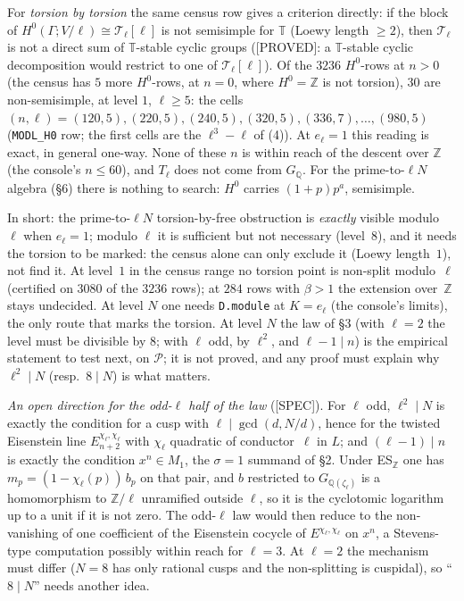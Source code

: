 \documentclass[11pt]{article}
\newcommand{\Z}{\mathbb{Z}}
\newcommand{\Q}{\mathbb{Q}}
\newcommand{\Ga}{\Gamma}
\newcommand{\code}[1]{\texttt{#1}}
\newcommand{\PROVED}{\textsf{\small[PROVED]}}
\newcommand{\PGSPEC}{\textsf{\small[SPEC]}}
\begin{document}
For \emph{torsion by torsion} the same census row gives a criterion directly: if the block of $H^{0}(\Ga;V/\ell)\cong\mathcal T_\ell[\ell]$ is not semisimple for $\mathbb T$ (Loewy length $\ge2$), then $\mathcal T_\ell$ is not a direct sum of $\mathbb T$-stable cyclic groups (\PROVED: a $\mathbb T$-stable cyclic decomposition would restrict to one of $\mathcal T_\ell[\ell]$). Of the $3236$ $H^{0}$-rows at $n>0$ (the census has $5$ more $H^{0}$-rows, at $n=0$, where $H^{0}=\Z$ is not torsion), $30$ are non-semisimple, at level $1$, $\ell\ge5$: the cells $(n,\ell)=(120,5),(220,5),(240,5),(320,5),(336,7),\dots,(980,5)$ (\code{MODL\_H0} row; the first cells are the $\ell^{3}-\ell$ of {}(4)). At $e_\ell=1$ this reading is exact, in general one-way. None of these $n$ is within reach of the descent over $\Z$ (the console's $n\le60$), and $T_\ell$ does not come from $G_\Q$. For the prime-to-$\ell N$ algebra (\S6) there is nothing to search: $H^{0}$ carries $(1+p)p^{a}$, semisimple.

In short: the prime-to-$\ell N$ torsion-by-free obstruction is \emph{exactly} visible modulo~$\ell$ when $e_\ell=1$; modulo $\ell$ it is sufficient but not necessary (level~$8$), and it needs the torsion to be marked: the census alone can only exclude it (Loewy length~$1$), not find it. At level~$1$ in the census range no torsion point is non-split modulo~$\ell$ (certified on $3080$ of the $3236$ rows); at $284$ rows with $\beta>1$ the extension over~$\Z$ stays undecided. At level $N$ one needs \code{D.module} at $K=e_\ell$ (the console's limits), the only route that marks the torsion. At level $N$ the law of \S3 (with $\ell=2$ the level must be divisible by $8$; with $\ell$ odd, by $\ell^{2}$, and $\ell-1\mid n$) is the empirical statement to test next, on $\mathcal P$; it is not proved, and any proof must explain why $\ell^{2}\mid N$ (resp.\ $8\mid N$) is what matters.

\emph{An open direction for the odd-$\ell$ half of the law} (\PGSPEC). For $\ell$ odd, $\ell^{2}\mid N$ is exactly the condition for a cusp with $\ell\mid\gcd(d,N/d)$, hence for the twisted Eisenstein line $E_{n+2}^{\chi_\ell,\chi_\ell}$ with $\chi_\ell$ quadratic of conductor~$\ell$ in $L$; and $(\ell-1)\mid n$ is exactly the condition $x^{n}\in M_1$, the $\sigma=1$ summand of \S2. Under ES$_\Z$ one has $m_p=(1-\chi_\ell(p))\,b_p$ on that pair, and $b$ restricted to $G_{\Q(\zeta_\ell)}$ is a homomorphism to $\Z/\ell$ unramified outside $\ell$, so it is the cyclotomic logarithm up to a unit if it is not zero. The odd-$\ell$ law would then reduce to the non-vanishing of one coefficient of the Eisenstein cocycle of $E^{\chi_\ell,\chi_\ell}$ on $x^{n}$, a Stevens-type computation possibly within reach for $\ell=3$. At $\ell=2$ the mechanism must differ ($N=8$ has only rational cusps and the non-splitting is cuspidal), so ``$8\mid N$'' needs another idea.
\end{document}
